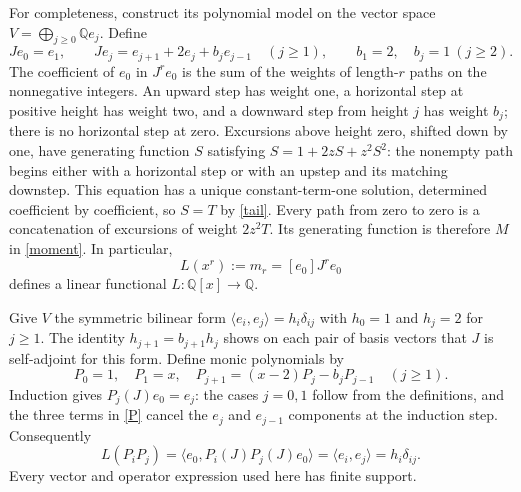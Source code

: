 \documentclass[11pt]{article}
\newcommand{\Q}{\mathbb Q}
\begin{document}
For completeness, construct its polynomial model on the vector space
$V=\bigoplus_{j\geq0}\Q e_j$. Define
\[
Je_0=e_1,\qquad
Je_j=e_{j+1}+2e_j+b_je_{j-1}\quad(j\geq1),\qquad
b_1=2,\quad b_j=1\ (j\geq2).
\]
The coefficient of $e_0$ in $J^re_0$ is the sum of the weights of
length-$r$ paths on the nonnegative integers. An upward step has
weight one, a horizontal step at positive height has weight two,
and a downward step from height $j$ has weight $b_j$; there is no
horizontal step at zero. Excursions above height zero, shifted down
by one, have generating function $S$ satisfying
$S=1+2zS+z^2S^2$: the nonempty path begins either with a horizontal
step or with an upstep and its matching downstep. This equation
has a unique constant-term-one solution, determined coefficient by
coefficient, so $S=T$ by \eqref{tail}. Every path from zero to zero
is a concatenation of excursions of weight $2z^2T$. Its generating
function is therefore $M$ in \eqref{moment}. In particular,
\begin{equation}\label{L}
L(x^r):=m_r=[e_0]J^re_0
\end{equation}
defines a linear functional $L:\Q[x]\to\Q$.

Give $V$ the symmetric bilinear form
$\langle e_i,e_j\rangle=h_i\delta_{ij}$ with $h_0=1$ and
$h_j=2$ for $j\geq1$. The identity $h_{j+1}=b_{j+1}h_j$
shows on each pair of basis vectors that $J$ is self-adjoint for
this form. Define monic polynomials by
\begin{equation}\label{P}
P_0=1,\quad P_1=x,\quad
P_{j+1}=(x-2)P_j-b_jP_{j-1}\quad(j\geq1).
\end{equation}
Induction gives $P_j(J)e_0=e_j$: the cases $j=0,1$ follow from
the definitions, and the three terms in \eqref{P} cancel the
$e_j$ and $e_{j-1}$ components at the induction step. Consequently
\begin{equation}\label{orth}
L(P_iP_j)=\langle e_0,P_i(J)P_j(J)e_0\rangle
 =\langle e_i,e_j\rangle=h_i\delta_{ij}.
\end{equation}
Every vector and operator expression used here has finite support.
\end{document}
